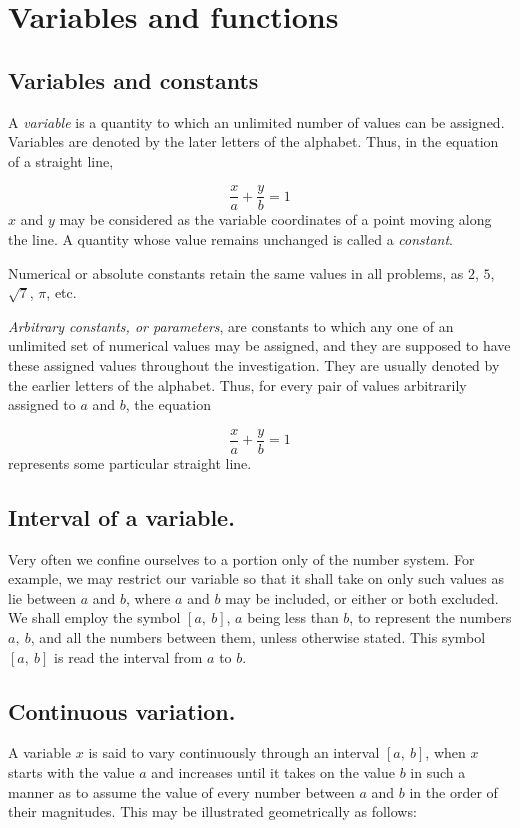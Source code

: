 \chapter{Variables and functions}

 
\section{Variables and constants} 

A {\it variable} is a quantity to which an unlimited number of values 
can be assigned. Variables are denoted by the later letters of 
the alphabet. Thus, in the equation of a straight line,

\[
    \frac{x}{a} + \frac{y}{b} = 1
\]
$x$ and $y$ may be considered as the variable coordinates of a 
point moving along the line.
A quantity whose value remains unchanged is called a {\it constant}.

Numerical or absolute constants retain the same values in all problems, 
as $2$, $5$, $\sqrt{7}$, $\pi$, etc.

{\it Arbitrary constants, or parameters}, are constants to which any 
one of an unlimited set of numerical values may be assigned, 
and they are supposed to have these assigned values throughout 
the investigation. They are usually denoted by the earlier 
letters of the alphabet. Thus, for every pair of values arbitrarily 
assigned to $a$ and $b$, the equation

\[
    \frac{x}{a} + \frac{y}{b} = 1
\]
represents some particular straight line.


\section{Interval of a variable.} Very often we confine ourselves 
to a portion only of the number system. For example, we may 
restrict our variable so that it shall take on only such values 
as lie between $a$ and $b$, where $a$ and $b$ may be included, or 
either or both excluded. We shall employ the symbol 
$\left \lbrack a,\ b \right \rbrack$, $a$ being less than $b$, 
to represent the numbers $a,\ b$, and all the numbers between 
them, unless otherwise stated. This symbol 
$\left \lbrack a,\ b \right \rbrack$ is read the interval from 
$a$ to $b$.


\section{Continuous variation.} A variable $x$ is said to vary continuously 
through an interval $\left \lbrack a,\ b \right \rbrack$, when 
$x$ starts with the value $a$ and increases until it takes on 
the value $b$ in such a manner as to assume the value of every 
number between $a$ and $b$ in the order of their magnitudes. 
This may be illustrated geometrically as follows:


